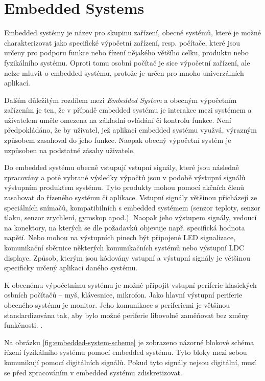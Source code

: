 \documentclass[a4paper, twoside, 11pt]{article}
\begin{document}
	\section{Embedded Systems}
	Embedded systémy je název pro skupinu zařízení, obecně systémů, které je možné charakterizovat jako specifické výpočetní zařízení, resp. počítače, které jsou určeny pro podporu funkce nebo řízení nějakého většího celku, produktu nebo fyzikálního systému. Oproti tomu osobní počítač je sice výpočetní zařízení, ale nelze mluvit o embedded systému, protože je určen pro mnoho univerzálních aplikací. \cite{Sass2010}\par
	Dalším důležitým rozdílem mezi \textit{Embedded System} a obecným výpočetním zařízením je ten, že v případě embedded systému je interakce mezi systémem a uživatelem uměle omezena na základní ovládání či kontrolu funkce. Není předpokládáno, že by uživatel, jež aplikaci embedded systému využvá, výrazným způsobem zasahoval do jeho funkce. Naopak obecný výpočetní systém je uzpůsoben na podstatné zásahy uživatele. \cite{Sass2010} \cite{juan-fpgas}\par
	Do embedded systému obecně vstupují vstupní signály, které jsou následně zpracovány a poté vybrané výsledky výpočtů jsou v podobě výstupní signálů výstupním produktem systému. Tyto produkty mohou pomocí akčních členů zasahovat do řízeného systému či aplikace. Vstupní signály většinou přicházejí ze speciálních snímačů, kompatibilních s embedded systémem (senzor teploty, senzor tlaku, senzor zrychlení, gyroskop apod.). Naopak jeho výstupem signály, vedoucí na konektory, na kterých se dle požadavků objevuje např. specifická hodnota napětí. Nebo mohou na výstupních pinech být připojené LED signalizace, komunikační sběrnice některých komunikačních systémů nebo výstupní LDC displaye. Způsob, kterým jsou kódovány vstupní a výstupní signály je většinou specificky určený aplikaci daného systému. \cite{Sass2010}\par
	K obecnému výpočetnímu systému je možné připojit vstupní periferie klasických osbních počítačů – myš, klávesnice, mikrofon. Jako hlavní výstupní periferie obecného systému je monitor. Jeho komunikace s periferiemi je většinou standardizována tak, aby bylo možné periferie libovolně zaměňovat bez změny funkčnosti. \cite{Sass2010}.\par
	Na obrázku \ref{fig:embedded-system-scheme} je zobrazeno názorné blokové schéma řízení fyzikálního systému pomocí embedded systému. Tyto bloky mezi sebou komunikují pomocí digitálních signálů. Pokud tyto signály nejsou digitální, musí se před zpracováním v embedded systému zdiskretizovat.
\end{document}
